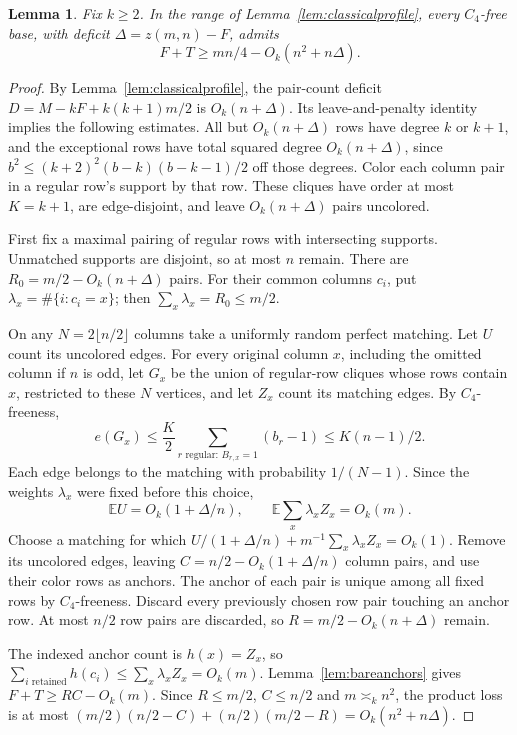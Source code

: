 \documentclass[11pt]{article}
\newtheorem{lemma}[theorem]{Lemma}
\begin{document}
\begin{lemma}\label{lem:profilequarter}
Fix $k\ge2$. In the range of Lemma~\ref{lem:classicalprofile}, every
$C_4$-free base, with deficit $\Delta=z(m,n)-F$, admits
\[
 F+T\ge mn/4-O_k(n^2+n\Delta).
\]
\end{lemma}
\begin{proof}
By Lemma~\ref{lem:classicalprofile}, the pair-count deficit
$D=M-kF+k(k+1)m/2$ is $O_k(n+\Delta)$.
Its leave-and-penalty identity implies the following estimates.
All but $O_k(n+\Delta)$ rows have degree $k$ or $k+1$, and the
exceptional rows have total squared degree $O_k(n+\Delta)$, since
$b^2\le(k+2)^2(b-k)(b-k-1)/2$ off those degrees. Color each column pair in
a regular row's support by that row. These cliques have order at most
$K=k+1$, are edge-disjoint, and leave $O_k(n+\Delta)$ pairs uncolored.

First fix a maximal pairing of regular rows with intersecting supports.
Unmatched supports are disjoint, so at most $n$ remain. There are
$R_0=m/2-O_k(n+\Delta)$ pairs. For their common columns $c_i$, put
$\lambda_x=\#\{i:c_i=x\}$; then $\sum_x\lambda_x=R_0\le m/2$.

On any $N=2\lfloor n/2\rfloor$ columns take a uniformly random perfect
matching. Let $U$ count its uncolored edges. For every original column $x$,
including the omitted column if $n$ is odd, let $G_x$ be the union of
regular-row cliques whose rows contain $x$, restricted to these $N$ vertices,
and let $Z_x$ count its matching edges. By $C_4$-freeness,
\[
 e(G_x)\le\frac K2\sum_{r\text{ regular}:\,B_{r,x}=1}(b_r-1)
 \le K(n-1)/2.
\]
Each edge belongs to the matching with probability $1/(N-1)$. Since the
weights $\lambda_x$ were fixed before this choice,
\[
 \mathbb E U=O_k(1+\Delta/n),\qquad
 \mathbb E\sum_x\lambda_xZ_x=O_k(m).
\]
Choose a matching for which
$U/(1+\Delta/n)+m^{-1}\sum_x\lambda_xZ_x=O_k(1)$.
Remove its uncolored edges, leaving
$C=n/2-O_k(1+\Delta/n)$ column pairs, and use their color rows as anchors.
The anchor of each pair is unique among all fixed rows by $C_4$-freeness.
Discard every previously chosen row pair touching an anchor row. At most
$n/2$ row pairs are discarded, so $R=m/2-O_k(n+\Delta)$ remain.

The indexed anchor count is $h(x)=Z_x$, so
$\sum_{i\text{ retained}}h(c_i)\le\sum_x\lambda_xZ_x=O_k(m)$.
Lemma~\ref{lem:bareanchors} gives $F+T\ge RC-O_k(m)$.
Since $R\le m/2$, $C\le n/2$ and $m\asymp_k n^2$, the product loss is at most
$(m/2)(n/2-C)+(n/2)(m/2-R)=O_k(n^2+n\Delta)$.
\end{proof}
\end{document}
